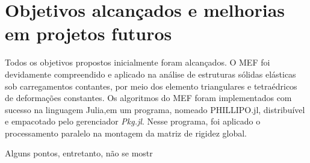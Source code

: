 \chapter{Objetivos alcançados e melhorias em projetos futuros}

Todos os objetivos propostos inicialmente foram alcançados. O MEF foi devidamente compreendido e aplicado na análise de estruturas sólidas elásticas sob carregamentos contantes, por meio dos elemento triangulares e tetraédricos de deformações constantes. Os algoritmos do MEF foram implementados com sucesso na linguagem Julia,em um programa, nomeado PHILLIPO.jl, distribuível e empacotado pelo gerenciador \emph{Pkg.jl}. Nesse programa, foi aplicado o processamento paralelo na montagem da matriz de rigidez global.

Alguns pontos, entretanto, não se mostr

